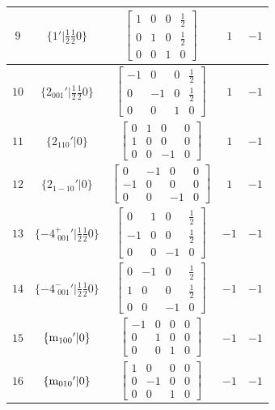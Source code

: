\documentclass[fleqn,8pt]{jsarticle}
\begin{document}
\begin{longtable}{ccccc}
$ 9 $ & $ \{1{}'|\frac{1}{2} \frac{1}{2} 0\} $ & $ \begin{bmatrix} 1 & 0 & 0 & \frac{1}{2} \\ 0 & 1 & 0 & \frac{1}{2} \\ 0 & 0 & 1 & 0 \end{bmatrix} $ & $ 1 $ & $ -1 $ \\ \hline
$ 10 $ & $ \{2{}_{001}{}'|\frac{1}{2} \frac{1}{2} 0\} $ & $ \begin{bmatrix} -1 & 0 & 0 & \frac{1}{2} \\ 0 & -1 & 0 & \frac{1}{2} \\ 0 & 0 & 1 & 0 \end{bmatrix} $ & $ 1 $ & $ -1 $ \\ \hline
$ 11 $ & $ \{2{}_{110}{}'|0\} $ & $ \begin{bmatrix} 0 & 1 & 0 & 0 \\ 1 & 0 & 0 & 0 \\ 0 & 0 & -1 & 0 \end{bmatrix} $ & $ 1 $ & $ -1 $ \\ \hline
$ 12 $ & $ \{2{}_{1-10}{}'|0\} $ & $ \begin{bmatrix} 0 & -1 & 0 & 0 \\ -1 & 0 & 0 & 0 \\ 0 & 0 & -1 & 0 \end{bmatrix} $ & $ 1 $ & $ -1 $ \\ \hline
$ 13 $ & $ \{-4^{+}_{\,\,001}{}'|\frac{1}{2} \frac{1}{2} 0\} $ & $ \begin{bmatrix} 0 & 1 & 0 & \frac{1}{2} \\ -1 & 0 & 0 & \frac{1}{2} \\ 0 & 0 & -1 & 0 \end{bmatrix} $ & $ -1 $ & $ -1 $ \\ \hline
$ 14 $ & $ \{-4^{-}_{\,\,001}{}'|\frac{1}{2} \frac{1}{2} 0\} $ & $ \begin{bmatrix} 0 & -1 & 0 & \frac{1}{2} \\ 1 & 0 & 0 & \frac{1}{2} \\ 0 & 0 & -1 & 0 \end{bmatrix} $ & $ -1 $ & $ -1 $ \\ \hline
$ 15 $ & $ \{{\rm m}_{100}{}'|0\} $ & $ \begin{bmatrix} -1 & 0 & 0 & 0 \\ 0 & 1 & 0 & 0 \\ 0 & 0 & 1 & 0 \end{bmatrix} $ & $ -1 $ & $ -1 $ \\ \hline
$ 16 $ & $ \{{\rm m}_{010}{}'|0\} $ & $ \begin{bmatrix} 1 & 0 & 0 & 0 \\ 0 & -1 & 0 & 0 \\ 0 & 0 & 1 & 0 \end{bmatrix} $ & $ -1 $ & $ -1 $ \\
\end{longtable}
\end{document}
